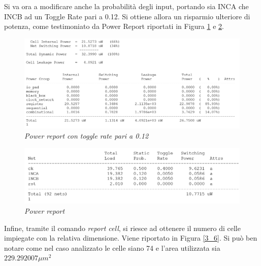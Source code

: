 Si va ora a modificare anche la probabilità degli input, portando sia INCA che INCB ad un Toggle Rate pari a 0.12. Si ottiene allora un risparmio ulteriore di potenza, come testimoniato da Power Report riportati in Figura \ref{3_4} e \ref{3_5}.
\begin{figure}[!htb]
	\centering
	\includegraphics[scale=0.8]{immagini/3_4}
	\caption{\textit{Power report con toggle rate pari a 0.12}}
	\label{3_4}
\end{figure}
\begin{figure}[!htb]
	\centering
	\includegraphics[scale=0.9]{immagini/3_5}
	\caption{\textit{Power report }}
	\label{3_5}
\end{figure}
\newpage
\noindent Infine, tramite il comando \textit{report cell}, si riesce ad ottenere il numero di celle impiegate con la relativa dimensione. Viene riportato in Figura \ref{3_6}. Si può ben notare come nel caso analizzato le celle siano 74 e l'area utilizzata sia $229.292007 \mu m^{2}$ \\
